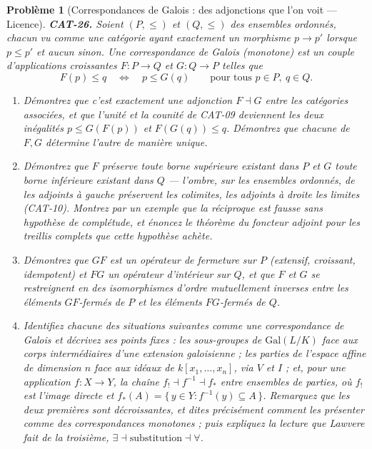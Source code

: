 \documentclass[11pt]{article}
\newtheorem{problem}{Problème}
\begin{document}
\begin{problem}[{Correspondances de Galois : des adjonctions que l'on voit --- Licence}]
\textbf{CAT-26.} Soient $ (P, \le) $ et $ (Q, \le) $ des ensembles ordonnés, chacun vu
comme une catégorie ayant exactement un morphisme $ p \to p' $ lorsque $ p \le p' $ et aucun
sinon. Une \textit{correspondance de Galois} (monotone) est un couple d'applications croissantes
$ F \colon P \to Q $ et $ G \colon Q \to P $ telles que
\[ F(p) \le q \quad \Longleftrightarrow \quad p \le G(q) \qquad \text{pour tous } p \in P,\ q \in Q. \]
\begin{enumerate}
\item[(a)] Démontrez que c'est exactement une adjonction $ F \dashv G $ entre les catégories
associées, et que l'unité et la counité de CAT-09 deviennent les deux inégalités
$ p \le G(F(p)) $ et $ F(G(q)) \le q $. Démontrez que chacune de $ F, G $ détermine
l'autre de manière unique.
\item[(b)] Démontrez que $ F $ préserve toute borne supérieure existant dans $ P $ et $ G $ toute
borne inférieure existant dans $ Q $ --- l'ombre, sur les ensembles ordonnés, de \og{} les adjoints à
gauche préservent les colimites, les adjoints à droite les limites \fg{} (CAT-10). Montrez par un
exemple que la réciproque est fausse sans hypothèse de complétude, et énoncez le théorème du
foncteur adjoint pour les treillis complets que cette hypothèse achète.
\item[(c)] Démontrez que $ GF $ est un opérateur de fermeture sur $ P $ (extensif, croissant,
idempotent) et $ FG $ un opérateur d'intérieur sur $ Q $, et que $ F $ et $ G $ se
restreignent en des isomorphismes d'ordre mutuellement inverses entre les éléments
$ GF $-fermés de $ P $ et les éléments $ FG $-fermés de $ Q $.
\item[(d)] Identifiez chacune des situations suivantes comme une correspondance de Galois et décrivez
ses points fixes : les sous-groupes de $ \mathrm{Gal}(L/K) $ face aux corps intermédiaires
d'une extension galoisienne ; les parties de l'espace affine de dimension $ n $ face aux idéaux
de $ k[x_1, \dots, x_n] $, via $ V $ et $ I $ ; et, pour une application
$ f \colon X \to Y $, la chaîne $ f_{!} \dashv f^{-1} \dashv f_{*} $ entre ensembles de
parties, où $ f_{!} $ est l'image directe et
$ f_{*}(A) = \{\, y \in Y : f^{-1}(y) \subseteq A \,\} $. Remarquez que les deux premières sont
\textit{décroissantes}, et dites précisément comment les présenter comme des correspondances
monotones ; puis expliquez la lecture que Lawvere fait de la troisième,
$ \exists \dashv \text{substitution} \dashv \forall $.
\end{enumerate}

\end{problem}
\end{document}
